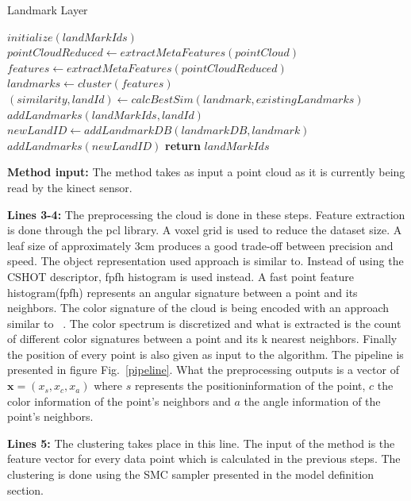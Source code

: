 \documentclass[]{article}
\begin{document}
\begin{algorithm}
    \caption{Landmark Layer}\label{euclid}
    \begin{algorithmic}[1]
        \State $initialize(landMarkIds)$
        \State $pointCloudReduced \gets extractMetaFeatures(pointCloud)$ 
        \State $features \gets extractMetaFeatures(pointCloudReduced)$
        \State $landmarks \gets cluster(features)$  
        \State $ (similarity, landId) \gets calcBestSim(landmark, existingLandmarks) $
        \State $ addLandmarks(landMarkIds, landId)$
        \Else 
        \State $ newLandID \gets addLandmarkDB(landmarkDB, landmark)$
        \State $addLandmarks(newLandID)$
        \EndIf
        \EndFor
        \State \textbf{return} $ landMarkIds$
        \EndProcedure
    \end{algorithmic}
\end{algorithm}


\textbf{Method input:} The method takes as input a point cloud as it is currently being read by the kinect sensor.

\textbf{Lines 3-4:} The preprocessing the cloud is done in these steps. Feature extraction is done through the pcl\cite{pcl} library. A voxel grid is used to reduce the dataset size. A leaf size of approximately 3cm produces a good trade-off between precision and speed. The object representation used approach is similar to\cite{objectpointslam}. Instead of using the CSHOT descriptor, fpfh\cite{fpfh} histogram is used instead. A fast point feature histogram(fpfh) represents an angular signature between a point and its neighbors. The color signature of the cloud is being encoded with an approach similar to ~\cite{smcddp}. The color spectrum is discretized and what is extracted is the count of different color signatures between a point and its k nearest neighbors. Finally the position of every point is also given as input to the algorithm. The pipeline is presented in figure Fig.~\ref{pipeline}. What the preprocessing outputs is a vector of $\textbf{x} =(x_s, x_c, x_a)$ where $s$ represents the positioninformation of the point, $c$ the color information of the point's neighbors and $a$ the angle information of the point's neighbors.

\textbf{Lines 5:} The clustering takes place in this line. The input of the method is the feature vector for every data point which is calculated in the previous steps. The clustering is done using the SMC sampler presented in the model definition section. 
\end{document}
